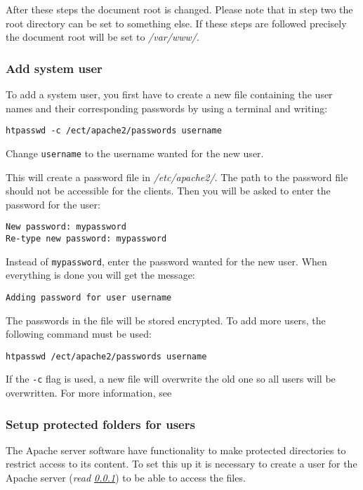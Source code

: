 After these steps the document root is changed. Please note that in step two the root directory can be set 
to something else. If these steps are followed precisely the document root will be set to \textit{/var/www/}.

\subsubsection{Add system user}\label{sec:exp_passw}
To add a system user, you first have to create a new file containing the user names and their corresponding passwords
by using a terminal and writing:
\begin{verbatim}htpasswd -c /ect/apache2/passwords username\end{verbatim}
Change \texttt{username} to the username wanted for the new user.

This will create a password file in \textit{/etc/apache2/}. 
The path to the password file should not be accessible for the clients. 
Then you will be asked to enter the password for the user:
\begin{verbatim}
New password: mypassword
Re-type new password: mypassword
\end{verbatim}

Instead of \texttt{mypassword}, enter the password wanted for the new user.
When everything is done you will get the message:
\begin{verbatim}Adding password for user username\end{verbatim}
The passwords in the file will be stored encrypted. To add more users, the following command must be used: 
\begin{verbatim}htpasswd /ect/apache2/passwords username\end{verbatim}
If the \texttt{-c} flag is used, a new file will overwrite the old one so all users will be overwritten. For more information, see \cite{exp_apache2user} 

\subsubsection{Setup protected folders for users}\label{sec:exp_protected}
The Apache server software have functionality to make protected directories to restrict access to its content. To set this 
up it is necessary to create a user for the Apache server (\textit{read \ref{sec:exp_passw}}) to be able to access the files. 

